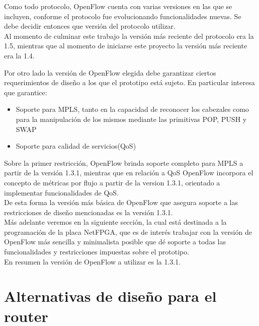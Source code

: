 
Como todo protocolo, OpenFlow cuenta con varias versiones en las que se incluyen, conforme el protocolo fue evolucionando funcionalidades nuevas. Se debe decidir entonces que versi\'on del protocolo utilizar.\\

Al momento de culminar este trabajo la versi\'on m\'as reciente del protocolo era la 1.5, mientras que al momento de iniciarse este proyecto la versi\'on m\'as reciente era la 1.4. 

Por otro lado la versi\'on de OpenFlow elegida debe garantizar ciertos requerimientos de dise\~no a los que el prototipo est\'a sujeto. En particular interesa que garantice:

\begin{itemize}
\item Soporte para MPLS, tanto en la capacidad de reconocer los cabezales como para la manipulaci\'on de los mismos mediante las primitivas POP, PUSH y SWAP
\item Soporte para calidad de servicios(QoS)
\end{itemize}

Sobre la primer restricci\'on, OpenFlow brinda soporte completo para MPLS a partir de la versi\'on 1.3.1, mientras que en relaci\'on a QoS OpenFlow incorpora el concepto de métricas por flujo a partir de la version 1.3.1, orientado a implementar funcionalidades de QoS.\\

De esta forma la versi\'on m\'as b\'asica de OpenFlow que asegura soporte a las restricciones de dise\~no mencionadas es la versi\'on 1.3.1.\\

M\'as adelante veremos en la siguiente secci\'on, la cual  est\'a destinada a la programaci\'on de la placa NetFPGA, que es de inter\'es trabajar con la versi\'on de OpenFlow m\'as sencilla y minimalista posible que d\'e soporte a todas las funcionalidades y restricciones impuestas sobre el prototipo.\\ 

En resumen la versi\'on de OpenFlow a utilizar es la 1.3.1.

\section[Alternativas de dise\~no para el router]{Alternativas de dise\~no para el router}


